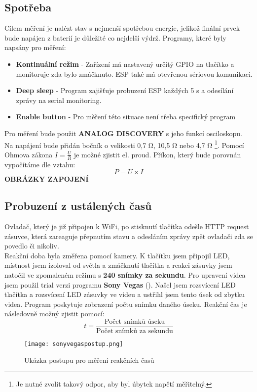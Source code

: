 \documentclass[a4paper, 12pt]{report}
\begin{document}
				\subsection{Spotřeba} \label{metodika:Ustálené stavy spotřeba}
					Cílem měření je nalézt stav s nejmenší spotřebou energie, jelikož finální prvek bude napájen z baterií je důležité co nejdelší výdrž. Programy, které byly napsány pro měření:\\
					\begin{itemize}
						\item {\bf Kontinuální režim} - Zařízení má nastavený určitý GPIO na tlačítko a monitoruje zda bylo zmáčknuto. ESP také má otevřenou sériovou komunikaci.
						\item {\bf Deep sleep} - Program zajišťuje probuzení ESP každých 5 \si{s} a odesílání zprávy na serial monitoring.
						\item {\bf Enable button} - Pro měření této situace není třeba specifický program
					\end{itemize}
					Pro měření bude použit {\bf ANALOG DISCOVERY} s jeho funkcí osciloskopu. Na napájení bude přidán bočník o velikosti 0,7 \si{\ohm}, 10,5 \si{\ohm} nebo 4,7 \si{\ohm} \footnote{Je nutné zvolit takový odpor, aby byl úbytek napětí měřitelný.}. Pomocí Ohmova zákona $ I = \frac{U}{R} $ je možné zjistit el. proud.
					Příkon, který bude porovnán vypočítáme dle vztahu:
					$$P = U \times I$$
					{\bf OBRÁZKY ZAPOJENÍ}
				\subsection{Probuzení z ustálených časů} \label{metodika:Ustálené stavy reakce}
					Ovladač, který je již připojen k WiFi, po stisknutí tlačítka odešle HTTP request zásuvce, která zareaguje přepnutím stavu a odesláním zprávy zpět ovladači zda se povedlo či nikoliv.\\
					Reakční doba byla změřena pomocí kamery. K tlačítku jsem připojil LED, místnost jsem izoloval od světla a zmáčknutí tlačítka a reakci zásuvky jsem natočil ve zpomaleném režimu s {\bf 240 snímky za sekundu}. Pro upravení videa jsem použil trial verzi programu {\bf Sony Vegas} (). Našel jsem rozsvícení LED tlačítka a rozsvícení LED zásuvky ve videu a ustřihl jsem tento úsek od zbytku videa. Program poskytuje zobrazení počtu snímku daného úseku. Reakční čas je následovně možný zjistit pomocí:
					$$ t = \frac{\textrm{Počet snímků úseku}}{\textrm{Počet snímků za sekundu}}$$
					\begin{figure}[h]
						\centering
						\texttt{[image: sonyvegaspostup.png]}
						\caption{Ukázka postupu pro měření reakčních časů}
						\label{sonyvegaspostup}
					\end{figure}
\end{document}
